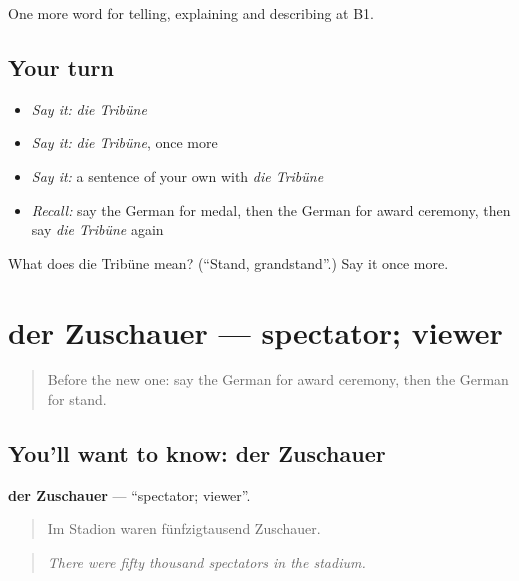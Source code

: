 \begin{grammarlens}[title={What you've built}]
One more word for telling, explaining and describing at B1.
\end{grammarlens}

\subsection*{Your turn}
\begin{itemize}
\raggedright
  \item \emph{Say it:} \emph{die Tribüne}
  \item \emph{Say it:} \emph{die Tribüne}, once more
  \item \emph{Say it:} a sentence of your own with \emph{die Tribüne}
  \item \emph{Recall:} say the German for medal, then the German for award ceremony, then say \emph{die Tribüne} again
\end{itemize}

\begin{tcolorbox}[breakable,colback=teal!4,colframe=teal!35!black,title={Before you move on}]
What does die Tribüne mean? (\textquotedblleft{}Stand, grandstand\textquotedblright{}.) Say it once more.
\end{tcolorbox}
\section[der Zuschauer]{der Zuschauer — spectator; viewer}

\label{lesson:GE-C510-zuschauer}



\begin{quote}
Before the new one: say the German for award ceremony, then the German for stand.
\end{quote}

\subsection*{You'll want to know: der Zuschauer}
\textbf{der Zuschauer} — \textquotedblleft{}spectator; viewer\textquotedblright{}.

\begin{quote}
Im Stadion waren fünfzigtausend Zuschauer.
\end{quote}

\begin{quote}
\emph{There were fifty thousand spectators in the stadium.}
\end{quote}

